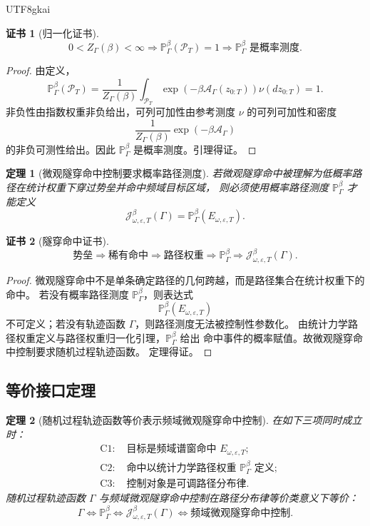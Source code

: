 \documentclass[12pt]{article}
\newtheorem{theorem}{定理}[section]
\newtheorem{Certificate}{证书}[section]
\newcommand{\Prob}{\mathbb P}
\begin{document}
\begin{CJK*}{UTF8}{gkai}
\begin{Certificate}[归一化证书]
\[
\boxed{
0<Z_\Gamma(\beta)<\infty
\Rightarrow
\Prob_\Gamma^\beta(\mathcal P_T)=1
\Rightarrow
\Prob_\Gamma^\beta\text{ 是概率测度}.
}
\]
\end{Certificate}

\begin{proof}
由定义，
\[
\Prob_\Gamma^\beta(\mathcal P_T)
=
\frac{1}{Z_\Gamma(\beta)}
\int_{\mathcal P_T}
\exp\!\left(-\beta\mathcal A_\Gamma(z_{0:T})\right)\nu(dz_{0:T})
=1.
\]
非负性由指数权重非负给出，可列可加性由参考测度 \(\nu\) 的可列可加性和密度
\[
\frac{1}{Z_\Gamma(\beta)}
\exp(-\beta\mathcal A_\Gamma)
\]
的非负可测性给出。因此 \(\Prob_\Gamma^\beta\) 是概率测度。引理得证。
\end{proof}

\begin{theorem}[微观隧穿命中控制要求概率路径测度]
若微观隧穿命中被理解为低概率路径在统计权重下穿过势垒并命中频域目标区域，
则必须使用概率路径测度 \(\Prob_\Gamma^\beta\) 才能定义
\[
\mathcal J_{\omega,\varepsilon,T}^{\beta}(\Gamma)
=
\Prob_\Gamma^\beta(E_{\omega,\varepsilon,T}).
\]
\end{theorem}

\begin{Certificate}[隧穿命中证书]
\[
\boxed{
\text{势垒}
\Rightarrow
\text{稀有命中}
\Rightarrow
\text{路径权重}
\Rightarrow
\Prob_\Gamma^\beta
\Rightarrow
\mathcal J_{\omega,\varepsilon,T}^{\beta}(\Gamma).
}
\]
\end{Certificate}

\begin{proof}
微观隧穿命中不是单条确定路径的几何跨越，而是路径集合在统计权重下的命中。
若没有概率路径测度 \(\Prob_\Gamma^\beta\)，则表达式
\[
\Prob_\Gamma^\beta(E_{\omega,\varepsilon,T})
\]
不可定义；若没有轨迹函数 \(\Gamma\)，则路径测度无法被控制性参数化。
由统计力学路径权重定义与路径权重归一化引理，\(\Prob_\Gamma^\beta\) 给出
命中事件的概率赋值。故微观隧穿命中控制要求随机过程轨迹函数。
定理得证。
\end{proof}

\subsection{等价接口定理}
\label{subsec:equivalent-interface-theorem}

\begin{theorem}[随机过程轨迹函数等价表示频域微观隧穿命中控制]
在如下三项同时成立时：
\[
\begin{aligned}
&\mathrm{C1}:\quad
\text{目标是频域谱窗命中 }E_{\omega,\varepsilon,T};\\
&\mathrm{C2}:\quad
\text{命中以统计力学路径权重 }\Prob_\Gamma^\beta\text{ 定义};\\
&\mathrm{C3}:\quad
\text{控制对象是可调路径分布律}.
\end{aligned}
\]
随机过程轨迹函数 \(\Gamma\) 与频域微观隧穿命中控制在路径分布律等价类意义下等价：
\[
\boxed{
\Gamma
\Longleftrightarrow
\Prob_\Gamma^\beta
\Longleftrightarrow
\mathcal J_{\omega,\varepsilon,T}^{\beta}(\Gamma)
\Longleftrightarrow
\text{频域微观隧穿命中控制}.
}
\]
\end{theorem}


\end{CJK*}
\end{document}
